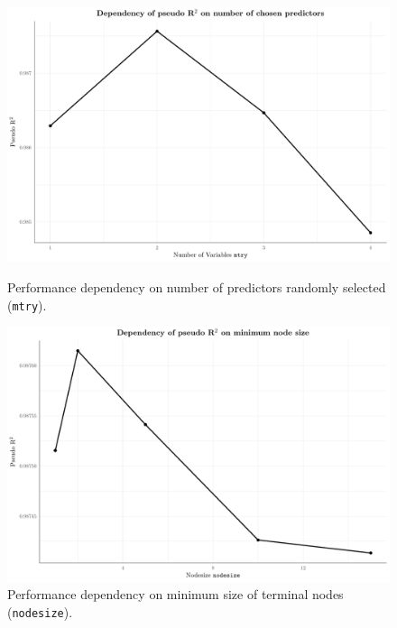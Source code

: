 \documentclass[a4paper,reqno,]{article}
\begin{document}
\begin{figure}[h!]
\centering
\begin{minipage}[h!]{0.45\textwidth}
\centering
    \includegraphics[width=1\textwidth]{images/RFR/mtry.pdf}
    \caption{Performance dependency on number of predictors randomly selected (\texttt{mtry}).}
        \label{fig:mtry}
\end{minipage}
\hspace{0.5cm}
\begin{minipage}[h!]{0.45\textwidth}
\centering
    \includegraphics[width=1\textwidth]{images/RFR/nodesize.pdf}
    \caption{Performance dependency on minimum size of terminal nodes (\texttt{nodesize}).}
        \label{fig:nodesize}
\end{minipage}
\end{figure} 
\newpage
\end{document}
